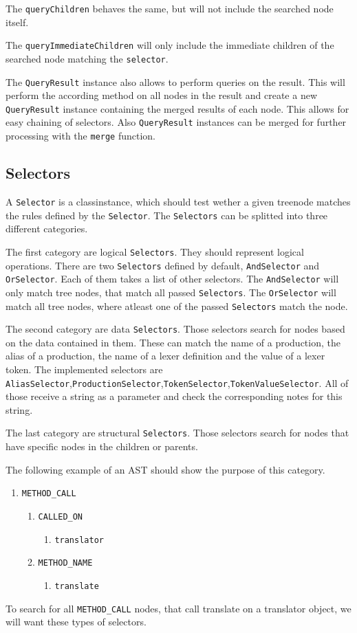 The \verb|queryChildren| behaves the same, but will not include the searched node itself.

The \verb|queryImmediateChildren| will only include the immediate children of the searched node matching the \verb|selector|.

The \verb|QueryResult| instance also allows to perform queries on the result. This will perform the according method on all nodes in the result and create a new \verb|QueryResult| instance containing the merged results of each node. This allows for easy chaining of selectors. Also \verb|QueryResult| instances can be merged for further processing with the \verb|merge| function.

\subsection{Selectors}

A \verb|Selector| is a classinstance, which should test wether a given treenode matches the rules defined by the \verb|Selector|. The \verb|Selectors| can be splitted into three different categories.

The first category are logical \verb|Selectors|. They should represent logical operations. There are two \verb|Selectors| defined by default, \verb|AndSelector| and \verb|OrSelector|. Each of them takes a list of other selectors. The \verb|AndSelector| will only match tree nodes, that match all passed \verb|Selectors|. The \verb|OrSelector| will match all tree nodes, where atleast one of the passed \verb|Selectors| match the node.


The second category are data \verb|Selectors|. Those selectors search for nodes based on the data contained in them. These can match the name of a production, the alias of a production, the name of a lexer definition and the value of a lexer token. The implemented selectors are \verb|AliasSelector|,\verb|ProductionSelector|,\verb|TokenSelector|,\verb|TokenValueSelector|. All of those receive a string as a parameter and check the corresponding notes for this string.


The last category are structural \verb|Selectors|. Those selectors search for nodes that have specific nodes in the children or parents. 

The following example of an AST should show the purpose of this category.
\begin{enumerate}
\item \verb|METHOD_CALL|
\begin{enumerate}
\item \verb|CALLED_ON|
\begin{enumerate}
\item \verb|translator|
\end{enumerate}
\item \verb|METHOD_NAME|
\begin{enumerate}
\item \verb|translate|
\end{enumerate}
\end{enumerate}
\end{enumerate}
To search for all \verb|METHOD_CALL| nodes, that call translate on a translator object, we will want these types of selectors.

